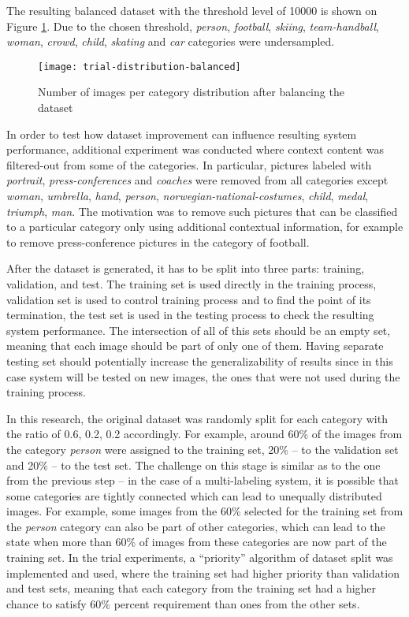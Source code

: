     The resulting balanced dataset with the threshold level of 10000 is shown on Figure \ref{fig:trial-distribution-balanced}. Due to the chosen threshold, \textit{person}, \textit{football}, \textit{skiing}, \textit{team-handball}, \textit{woman}, \textit{crowd}, \textit{child}, \textit{skating} and \textit{car} categories were undersampled.
    
    \begin{figure}[h!]
        \centering
        \texttt{[image: trial-distribution-balanced]}
        \caption{Number of images per category distribution after balancing the dataset}
        \label{fig:trial-distribution-balanced}
    \end{figure}
    
    In order to test how dataset improvement can influence resulting system performance, additional experiment was conducted where context content was filtered-out from some of the categories. In particular, pictures labeled with \textit{portrait}, \textit{press-conferences} and \textit{coaches} were removed from all categories except \textit{woman}, \textit{umbrella}, \textit{hand}, \textit{person}, \textit{norwegian-national-costumes}, \textit{child}, \textit{medal}, \textit{triumph}, \textit{man}. The motivation was to remove such pictures that can be classified to a particular category only using additional contextual information, for example to remove press-conference pictures in the category of football.
    
    After the dataset is generated, it has to be split into three parts: training, validation, and test. The training set is used directly in the training process, validation set is used to control training process and to find the point of its termination, the test set is used in the testing process to check the resulting system performance. The intersection of all of this sets should be an empty set, meaning that each image should be part of only one of them. Having separate testing set should potentially increase the generalizability of results since in this case system will be tested on new images, the ones that were not used during the training process. 
    
    In this research, the original dataset was randomly split for each category with the ratio of 0.6, 0.2, 0.2 accordingly. For example, around 60\% of the images from the category \textit{person} were assigned to the training set, 20\% -- to the validation set and 20\% -- to the test set. The challenge on this stage is similar as to the one from the previous step -- in the case of a multi-labeling system, it is possible that some categories are tightly connected which can lead to unequally distributed images. For example, some images from the 60\% selected for the training set from the \textit{person} category can also be part of other categories, which can lead to the state when more than 60\% of images from these categories are now part of the training set. In the trial experiments, a ``priority'' algorithm of dataset split was implemented and used, where the training set had higher priority than validation and test sets, meaning that each category from the training set had a higher chance to satisfy 60\% percent requirement than ones from the other sets.
    
